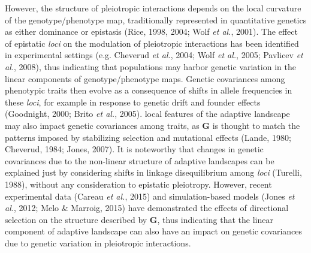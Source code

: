 \documentclass[12pt,twoside]{report}
\begin{document}
However, the structure of pleiotropic interactions depends on the local
curvature of the genotype/phenotype map, traditionally represented in
quantitative genetics as either dominance or epistasis (Rice, 1998,
2004; Wolf \emph{et al.}, 2001). The effect of epistatic \emph{loci} on
the modulation of pleiotropic interactions has been identified in
experimental settings (e.g. Cheverud \emph{et al.}, 2004; Wolf \emph{et
al.}, 2005; Pavlicev \emph{et al.}, 2008), thus indicating that
populations may harbor genetic variation in the linear components of
genotype/phenotype maps. Genetic covariances among phenotypic traits
then evolve as a consequence of shifts in allele frequencies in these
\emph{loci}, for example in response to genetic drift and founder
effects (Goodnight, 2000; Brito \emph{et al.}, 2005). local features of
the adaptive landscape may also impact genetic covariances among traits,
as $\mathbf{G}$ is thought to match the patterns imposed by stabilizing
selection and mutational effects (Lande, 1980; Cheverud, 1984; Jones,
2007). It is noteworthy that changes in genetic covariances due to the
non-linear structure of adaptive landscapes can be explained just by
considering shifts in linkage disequilibrium among \emph{loci} (Turelli,
1988), without any consideration to epistatic pleiotropy. However,
recent experimental data (Careau \emph{et al.}, 2015) and
simulation-based models (Jones \emph{et al.}, 2012; Melo \& Marroig,
2015) have demonstrated the effects of directional selection on the
structure described by $\mathbf{G}$, thus indicating that the linear
component of adaptive landscape can also have an impact on genetic
covariances due to genetic variation in pleiotropic interactions.
\end{document}
